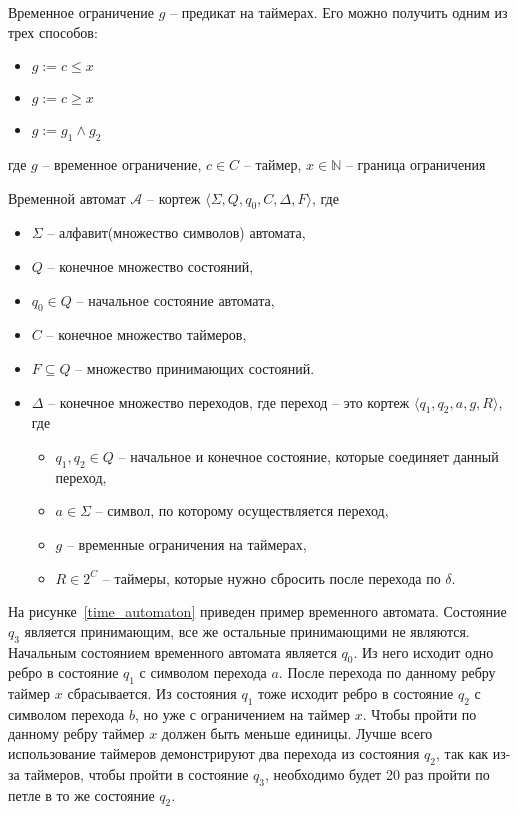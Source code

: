 \documentclass[times,specification,annotation]{itmo-student-thesis}
\begin{document}
\begin{definition}
  Временное ограничение $g$ -- предикат на таймерах. Его можно получить одним из трех способов:
  \begin{itemize}
    \item $g := c \leq x$
    \item $g := c \geq x$
    \item $g := g_1 \land g_2$
  \end{itemize}
  где $g$ -- временное ограничение, $c \in C$ -- таймер, $x \in \mathbb{N}$ -- граница ограничения
\end{definition}

\begin{definition}
  Временной автомат $\mathcal{A}$ -- кортеж $\langle \Sigma, Q, q_0, C, \Delta, F \rangle$, где
  \begin{itemize}
    \item $\Sigma$ -- алфавит(множество символов) автомата,
    \item $Q$ -- конечное множество состояний,
    \item $q_0 \in Q$ -- начальное состояние автомата,
    \item $C$ -- конечное множество таймеров,
    \item $F \subseteq Q$ -- множество принимающих состояний.
    \item $\Delta$ -- конечное множество переходов, где переход -- это кортеж $\langle q_1, q_2, a, g, R \rangle$, где
    \begin{itemize}
      \item $q_1, q_2 \in Q$ -- начальное и конечное состояние, которые соединяет данный переход,
      \item $a \in \Sigma$ -- символ, по которому осуществляется переход,
      \item $g$ -- временные ограничения на таймерах,
      \item $R \in 2^{C}$ -- таймеры, которые нужно сбросить после перехода по $\delta$. 
    \end{itemize}
  \end{itemize}
  \label{timed-automaton}
\end{definition}

\begin{example}
  На рисунке~\ref{time_automaton} приведен пример временного автомата. 
  Состояние $q_3$ является принимающим, все же остальные принимающими не являются. 
  Начальным состоянием временного автомата является $q_0$. 
  Из него исходит одно ребро в состояние $q_1$ с символом перехода $a$. 
  После перехода по данному ребру таймер $x$ сбрасывается. 
  Из состояния $q_1$ тоже исходит ребро в состояние $q_2$ с символом перехода $b$, но уже с ограничением на таймер $x$.
  Чтобы пройти по данному ребру таймер $x$ должен быть меньше единицы.
  Лучше всего использование таймеров демонстрируют два перехода из состояния $q_2$, так как из-за таймеров, 
  чтобы пройти в состояние $q_3$, необходимо будет 20 раз пройти по петле в то же состояние $q_2$.
\end{example}
\end{document}
